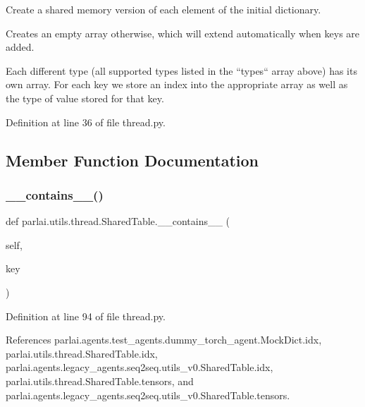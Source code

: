\begin{DoxyVerb}Create a shared memory version of each element of the initial dictionary.

Creates an empty array otherwise, which will extend
automatically when keys are added.

Each different type (all supported types listed in the ``types`` array
above) has its own array. For each key we store an index into the
appropriate array as well as the type of value stored for that key.
\end{DoxyVerb}
 

Definition at line 36 of file thread.\+py.



\subsection{Member Function Documentation}
\mbox{\label{classparlai_1_1utils_1_1thread_1_1SharedTable_afac82c3717ad0344c5bdfc7b8913d796}} 
\subsubsection{\texorpdfstring{\+\_\+\+\_\+contains\+\_\+\+\_\+()}{\_\_contains\_\_()}}
{\footnotesize\ttfamily def parlai.\+utils.\+thread.\+Shared\+Table.\+\_\+\+\_\+contains\+\_\+\+\_\+ (\begin{DoxyParamCaption}\item[{}]{self,  }\item[{}]{key }\end{DoxyParamCaption})}



Definition at line 94 of file thread.\+py.



References parlai.\+agents.\+test\+\_\+agents.\+dummy\+\_\+torch\+\_\+agent.\+Mock\+Dict.\+idx, parlai.\+utils.\+thread.\+Shared\+Table.\+idx, parlai.\+agents.\+legacy\+\_\+agents.\+seq2seq.\+utils\+\_\+v0.\+Shared\+Table.\+idx, parlai.\+utils.\+thread.\+Shared\+Table.\+tensors, and parlai.\+agents.\+legacy\+\_\+agents.\+seq2seq.\+utils\+\_\+v0.\+Shared\+Table.\+tensors.

